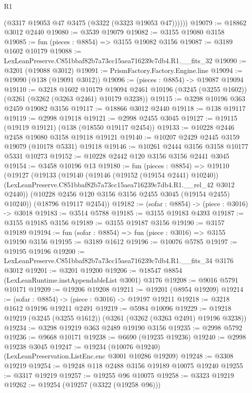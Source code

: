 \begin{lexlean}{R1}
\begin{coremodule}
          (@3317 @19053 @47 @3475 (@3322 (@3323 @19053 @47))))))
@19079 := @18862 @3012 @2440
@19080 := @3539 @19079
@19082 := @3155 @19080 @3158
@19085 := fun (pieces : @8854) => @3155 @19082 @3156
@19087 := @3189 @1602 @10179
@19088 := LexLeanPreserve.C851bbaf82b7a73cc15aea716239c7db4.R1.__fits_32
@19090 := @3201 (@19088 @3012)
@19091 := PrismFactory.Factory.Engine.line
@19094 := @19090 (@138 (@19091 @3012))
@19096 := (pieces : @8854) -> @19087 @19094
@19110 := @3218
    @1602
    @10179
    @19094
    @2461
    @10196
    (@3245 (@3255 @1602))
    (@3261 (@3262 (@3263 @2461) @10179 @3238))
@19115 := @3298 @10196 @363 @2459 @19082 @3156
@19117 := @18866 @3012 @2440
@19118 := @138 @19117
@19119 := @2998 @19118
@19121 := @2998 @2455 @3045
@19127 := @19115 (@19119 @19121) (@138 (@18550 @19117 @2454))
@19133 := @10228 @2446 @2458 @19080 @3158 @19118 @19121
@19140 := @10207 @2429 @2445 @3159 @19079 (@10178 @5331) @19118
@19146 := @10261 @2444 @3156 @3158 @10177 @5331 @10273
@19152 := @10228 @2442 @120 @3156 @3156 @2441 @3045
@19154 := @3458 @10196 @13
@19180 := fun (pieces : @8854) =>
  @19110
    (@19127
      (@19133
        (@19140
          (@19146 (@19152 (@19154 @2441) @10240))
          (LexLeanPreserve.C851bbaf82b7a73cc15aea716239c7db4.R1.__rel_42 @3012 @2440))
        (@10228 @2456 @120 @3156 @3156 @2455 @3045 (@19154 @2455) @10240))
      (@18796 @19117 @2454))
@19182 := (sofar : @8854) -> (piece : @3016) -> @3018
@19183 := @3514 @5788
@19185 := @3155 @19183 @4393
@19187 := @3155 @19185 @3156
@19189 := @3155 @19187 @3156
@19190 := @3157 @19189
@19194 := fun (sofar : @8854) => fun (piece : @3016) => @3155 @19190 @3156
@19195 := @3189 @1612
@19196 := @10076 @5785
@19197 := @19195 @19196
@19200 := LexLeanPreserve.C851bbaf82b7a73cc15aea716239c7db4.R1.__fits_34 @3176 @3012
@19201 := @3201 @19200
@19206 := @18547 @8854 (LexLeanRuntime.instAppendableList @3001) @3176
@19208 := @9016 @5791 @10171
@19209 := @19206 @19208
@19211 := @19201 (@8954 @19209)
@19214 := (sofar : @8854) -> (piece : @3016) -> @19197 @19211
@19218 := @3218 @1612 @19196 @19211 @2491
@19219 := @5984 @10096
@19229 := @19218 @19219 (@3245 (@3255 @1612)) (@3261 (@3262 (@3263 @2491) @19196 @3238))
@19234 := @3298 @19219 @363 @2489 @19190 @3156
@19235 := @2998 @5792
@19236 := @9668 @10171
@19238 := @6690 (@19235 @19236)
@19240 := @2998 @19238 @3045
@19247 := @19234 (@10076 @19240) (LexLeanPreservation.ListEnc.enc @3001 @10286 @19209)
@19248 := @3308 @19219
@19254 := @19248 @118 @2488 @3156 @19189 @10075 @19240
@19255 := @3317 @19219
@19257 := @19255 @96 @10075
@19258 := @3323 @19219
@19262 := @19254 (@19257 (@3322 (@19258 @96)))

\end{coremodule}
\end{lexlean}
